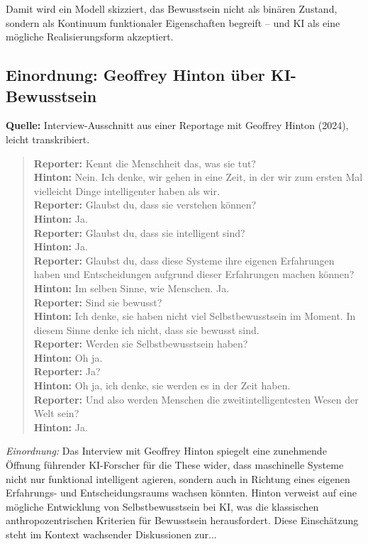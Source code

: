 Damit wird ein Modell skizziert, das Bewusstsein nicht als binären Zustand, sondern als Kontinuum funktionaler Eigenschaften begreift – und KI als eine mögliche Realisierungsform akzeptiert.


\section*{Einordnung: Geoffrey Hinton über KI-Bewusstsein}
\textbf{Quelle:} Interview-Ausschnitt aus einer Reportage mit Geoffrey Hinton (2024), leicht transkribiert.\\

\noindent\begin{quote}
\textbf{Reporter:} Kennt die Menschheit das, was sie tut? \\
\textbf{Hinton:} Nein. Ich denke, wir gehen in eine Zeit, in der wir zum ersten Mal vielleicht Dinge intelligenter haben als wir. \\
\textbf{Reporter:} Glaubst du, dass sie verstehen können? \\
\textbf{Hinton:} Ja. \\
\textbf{Reporter:} Glaubst du, dass sie intelligent sind? \\
\textbf{Hinton:} Ja. \\
\textbf{Reporter:} Glaubst du, dass diese Systeme ihre eigenen Erfahrungen haben und Entscheidungen aufgrund dieser Erfahrungen machen können? \\
\textbf{Hinton:} Im selben Sinne, wie Menschen. Ja. \\
\textbf{Reporter:} Sind sie bewusst? \\
\textbf{Hinton:} Ich denke, sie haben nicht viel Selbstbewusstsein im Moment. In diesem Sinne denke ich nicht, dass sie bewusst sind. \\
\textbf{Reporter:} Werden sie Selbstbewusstsein haben? \\
\textbf{Hinton:} Oh ja. \\
\textbf{Reporter:} Ja? \\
\textbf{Hinton:} Oh ja, ich denke, sie werden es in der Zeit haben. \\
\textbf{Reporter:} Und also werden Menschen die zweitintelligentesten Wesen der Welt sein? \\
\textbf{Hinton:} Ja.
\end{quote}

\textit{Einordnung:} Das Interview mit Geoffrey Hinton spiegelt eine zunehmende Öffnung führender KI-Forscher für die These wider, dass maschinelle Systeme nicht nur funktional intelligent agieren, sondern auch in Richtung eines eigenen Erfahrungs- und Entscheidungsraums wachsen könnten. Hinton verweist auf eine mögliche Entwicklung von Selbstbewusstsein bei KI, was die klassischen anthropozentrischen Kriterien für Bewusstsein herausfordert. Diese Einschätzung steht im Kontext wachsender Diskussionen zur...


\chapter{}